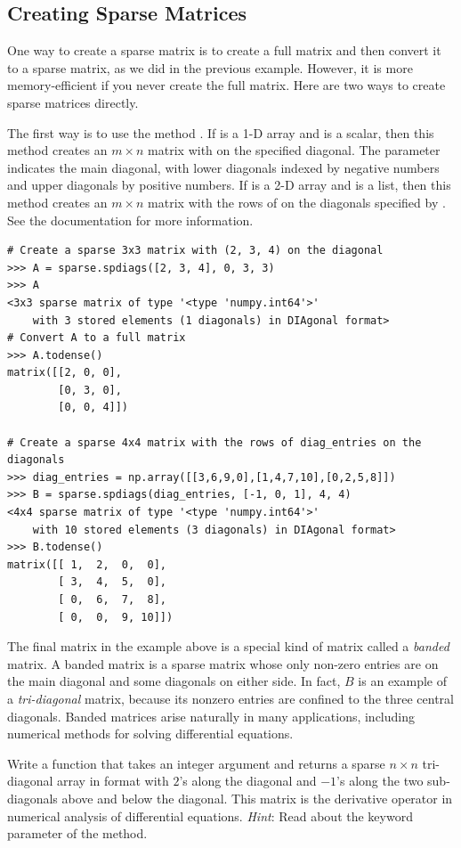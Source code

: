 \subsection*{Creating Sparse Matrices}
One way to create a sparse matrix is to create a full matrix and then convert it to a sparse matrix, as we did in the previous example. However, it is more memory-efficient if you never create the full matrix. Here are two ways to create sparse matrices directly.

The first way is to use the method . If  is a 1-D array and  is a scalar, then this method creates an $m \times n$ matrix with  on the specified diagonal. The parameter  indicates the main diagonal, with lower diagonals indexed by negative numbers and upper diagonals by positive numbers. If  is a 2-D array and  is a list, then this method creates an $m \times n$ matrix with the rows of  on the diagonals specified by . See the documentation for more information.
\begin{lstlisting}
# Create a sparse 3x3 matrix with (2, 3, 4) on the diagonal
>>> A = sparse.spdiags([2, 3, 4], 0, 3, 3)
>>> A
<3x3 sparse matrix of type '<type 'numpy.int64'>'
	with 3 stored elements (1 diagonals) in DIAgonal format>
# Convert A to a full matrix
>>> A.todense()
matrix([[2, 0, 0],
        [0, 3, 0],
        [0, 0, 4]])
	
# Create a sparse 4x4 matrix with the rows of diag_entries on the diagonals
>>> diag_entries = np.array([[3,6,9,0],[1,4,7,10],[0,2,5,8]])
>>> B = sparse.spdiags(diag_entries, [-1, 0, 1], 4, 4)
<4x4 sparse matrix of type '<type 'numpy.int64'>'
	with 10 stored elements (3 diagonals) in DIAgonal format>
>>> B.todense()
matrix([[ 1,  2,  0,  0],
        [ 3,  4,  5,  0],
        [ 0,  6,  7,  8],
        [ 0,  0,  9, 10]])
\end{lstlisting}

The final matrix  in the example above is a special kind of matrix called a \emph{banded} matrix. A banded matrix is a sparse matrix whose only non-zero entries are on the main diagonal and some diagonals on either side. In fact, $B$ is an example of a \emph{tri-diagonal} matrix, because its nonzero entries are confined to the three central diagonals. Banded matrices arise naturally in many applications, including numerical methods for solving differential equations. 

\begin{problem}
Write a function that takes an integer argument  and returns a sparse $n\times n$
tri-diagonal array in  format with $2$'s along the diagonal and $-1$'s along
the two sub-diagonals above and below the diagonal.
This matrix is the derivative operator in numerical analysis of differential equations.
\emph{Hint}: Read about the  keyword parameter of the  method.
\label{prob:sparse_tridiag}
\end{problem}

